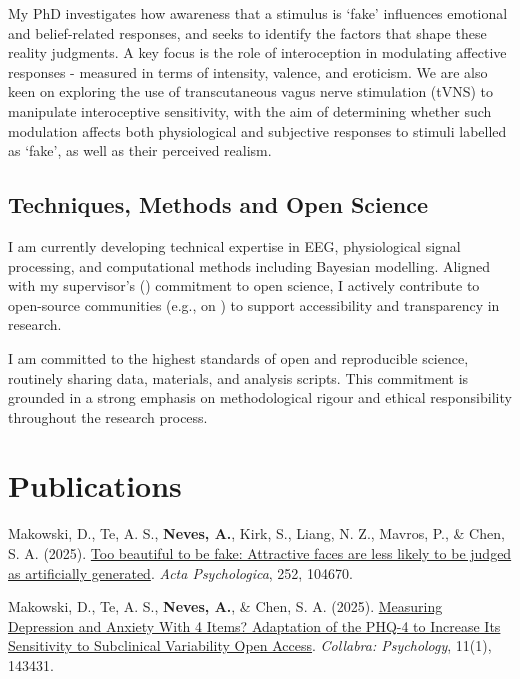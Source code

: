 \documentclass[11pt,a4paper,]{awesome-cv}
\begin{document}
\small

My PhD investigates how awareness that a stimulus is `fake' influences
emotional and belief-related responses, and seeks to identify the
factors that shape these reality judgments. A key focus is the role of
interoception in modulating affective responses - measured in terms of
intensity, valence, and eroticism. We are also keen on exploring the use
of transcutaneous vagus nerve stimulation (tVNS) to manipulate
interoceptive sensitivity, with the aim of determining whether such
modulation affects both physiological and subjective responses to
stimuli labelled as `fake', as well as their perceived realism.

\normalsize

\small

\subsection{Techniques, Methods and Open
Science}\label{techniques-methods-and-open-science}

I am currently developing technical expertise in EEG, physiological
signal processing, and computational methods including Bayesian
modelling. Aligned with my supervisor's
(\href{https://github.com/DominiqueMakowski}{})
commitment to open science, I actively contribute to open-source
communities (e.g., on
\href{https://github.com/AnafNeves}{})
to support accessibility and transparency in research.

I am committed to the highest standards of open and reproducible
science, routinely sharing data, materials, and analysis scripts. This
commitment is grounded in a strong emphasis on methodological rigour and
ethical responsibility throughout the research process.

\section{Publications}\label{publications}

Makowski, D., Te, A. S., \textbf{Neves, A.}, Kirk, S., Liang, N. Z.,
Mavros, P., \& Chen, S. A. (2025).
\href{https://doi.org/10.1016/j.actpsy.2024.104670}{Too beautiful to be
fake: Attractive faces are less likely to be judged as artificially
generated}. \emph{Acta Psychologica}, 252, 104670.

Makowski, D., Te, A. S., \textbf{Neves, A.}, \& Chen, S. A. (2025).
\href{https://doi.org/10.1525/collabra.143431}{Measuring Depression and
Anxiety With 4 Items? Adaptation of the PHQ-4 to Increase Its
Sensitivity to Subclinical Variability Open Access}. \emph{Collabra:
Psychology}, 11(1), 143431.
\end{document}
